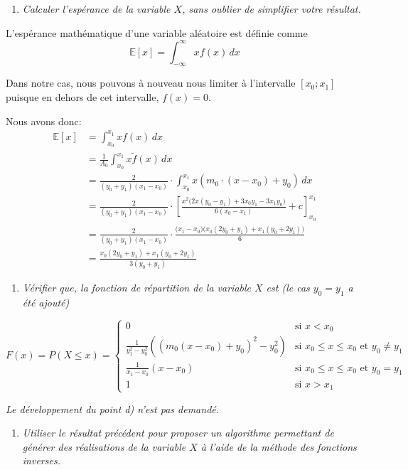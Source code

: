 \documentclass[a4paper,11pt]{report}
\newcommand{\point}[2]{
	\vspace{0.2mm}
	\begin{enumerate}[\indent #1)]
	\item {\em #2}
	\end{enumerate}
}
\begin{document}
\point{c}{Calculer l'espérance de la variable $X$, sans oublier de simplifier votre résultat.}

L'espérance mathématique d'une variable aléatoire est définie comme
\begin{equation*}
	\mathbb{E}[x] = \int_{-\infty}^{\infty} x f(x) \,dx
\end{equation*}

Dans notre cas, nous pouvons à nouveau nous limiter à l'intervalle $[x_{0}; x_{1}]$ puisque en dehors de cet intervalle, $f(x)=0$.

Nous avons donc:
\begingroup
\addtolength{\jot}{1em}
\begin{align*}
\mathbb{E}[x] &= \int_{x_0}^{x_1} x f(x) \,dx \\
	&= \frac{1}{A_0} \int_{x_0}^{x_1} x \tilde{f}(x) \,dx \\
	&= \frac{2}{(y_0 + y_1)(x_1 - x_0)} \cdot \int_{x_0}^{x_1} x (m_0 \cdot (x - x_0) + y_0) \,dx \\
	&= \frac{2}{(y_0 + y_1)(x_1 - x_0)} \cdot \left[ \frac{x^2 \big(2x (y_0-y_1) + 3 x_0 y_1 - 3 x_1 y_0\big)}{6 (x_0-x_1)}+c \right]^{x_1}_{x_0} \\
	&= \frac{2}{(y_0 + y_1)(x_1 - x_0)} \cdot \frac{\big(x_1-x_0\big) \big(x_0 (2 y_0+y_1)+x_1 (y_0+2 y_1)\big)}{6} \\
	&= \frac{x_0 (2y_0 + y_1) + x_1 (y_0 + 2y_1)}{3 (y_0+y_1)}
\end{align*}
\endgroup

\point{d}{Vérifier que, la fonction de répartition de la variable $X$ est (le cas $y_0 = y_1$ a été ajouté)}
\begin{equation*}
	F(x) = P(X \leq x) = \left\lbrace \begin{array}{ll}
		0						& \text{si $x < x_0$} \\
		\frac{1}{y^2_1 - y^2_0} \left( \left( m_0 \left( x - x_0 \right) + y_0 \right)^2 - y^2_0 \right)	& \text{si $x_0 \leq x \leq x_0$ et $y_0 \ne y_1$} \\
		\frac{1}{x_1-x_0} \left( x - x_0 \right)	& \text{si $x_0 \leq x \leq x_0$ et $y_0 = y_1$} \\
		1 						& \text{si $x > x_1$}
	\end{array} \right.
\end{equation*}

{\em Le développement du point d) n'est pas demandé. }

\point{e}{Utiliser le résultat précédent pour proposer un algorithme permettant de générer des réalisations de la variable $X$ à l'aide de la méthode des fonctions inverses.}
\end{document}
